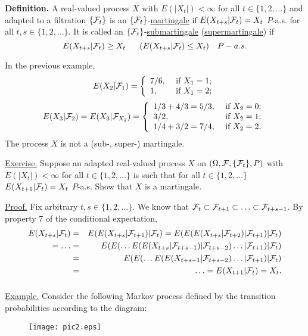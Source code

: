 \documentclass[a4paper,10pt]{article}
\newcommand{\1}[1]{\mathbf{1}_{\{#1\}}}
\begin{document}
{\bf Definition.} A real-valued process $X$ with $E(|X_t|)<\infty$ for all $t\in\{1,2,\ldots\}$ and adapted to a filtration $\{{\cal F}_t\}$ is an $\{{\cal F}_t\}$-\underline{martingale} if $E(X_{t+s}|{\cal F}_t)=X_t$ $P$-a.s. for all $t,s\in\{1,2,\ldots\}$. It is called an $\{{\cal F}_t\}$-\underline{submartingale} (\underline{supermartingale}) if
$$E(X_{t+s}|{\cal F}_t)\ge X_t~~~~~(E(X_{t+s}|{\cal F}_t)\le X_t)~~~P-a.s.$$

In the previous example,
$$E(X_2|{\cal F}_1)=\left\{\begin{array}{ll}
7/6, & \mbox{ if } X_1=1;\\ 1,& \mbox{ if } X_1=2; \end{array}\right.$$
$$E(X_3|{\cal F}_2)=E(X_3|{\cal F}_{X_2})=\left\{\begin{array}{ll}
1/3+4/3=5/3, & \mbox{ if } X_2=0;\\ 3/2, & \mbox{ if } X_2=1;\\ 1/4+3/2=7/4, & \mbox{ if } X_2=2. \end{array}\right.$$
The process $X$ is not a (sub-, super-) martingale.

\underline{Exercise.} Suppose an adapted real-valued process $X$ on $(\Omega,{\cal F},\{{\cal F}_t\},P)$ with $E(|X_t|)<\infty$ for all $t\in\{1,2,\ldots\}$ is such that for all $t\in\{1,2,\ldots\}$ $E(X_{t+1}|{\cal F}_t)=X_t$ $P$-a.s. Show that $X$ is a martingale.

\underline{Proof.} Fix arbitrary $t,s\in\{1,2,\ldots\}$. We know that ${\cal F}_t\subset{\cal F}_{t+1}\subset\ldots\subset {\cal F}_{t+s-1}$. By property 7 of the conditional expectation,
\begin{eqnarray*}
E(X_{t+s}|{\cal F}_t)&=& E(E(X_{t+s}|{\cal F}_{t+1})|{\cal F}_t)=E(E(E(X_{t+s}|{\cal F}_{t+2})|{\cal F}_{t+1})|{\cal F}_t) \\
=\ldots &=& E(E(\ldots E(E(X_{t+s}|{\cal F}_{t+s-1})|{\cal F}_{t+s-2})\ldots|{\cal F}_{t+1})|{\cal F}_t)\\
&=& E(E(\ldots E(E(X_{t+s-1}|{\cal F}_{t+s-2})\ldots|{\cal F}_{t+1})|{\cal F}_t)\\
&=& \ldots = E(X_{t+1}|{\cal F}_t)=X_t.
\end{eqnarray*}
$~$\hfill \blacksquare

\underline{Example.} Consider the following Markov process defined by the transition probabilities according to the diagram:

\begin{figure}[htbp]
\begin{center}
\texttt{[image: pic2.eps]}
\end{center}
\end{figure}
\end{document}

